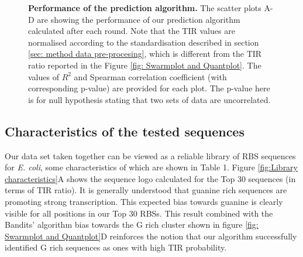 \documentclass{article}
\begin{document}
\begin{figure}[!ht]
\begin{subfigure}[b]{0.49\textwidth}
    \end{subfigure}
    \caption{\textbf{Performance of the prediction algorithm.} The scatter plots A-D are showing the performance of our prediction algorithm calculated after each round.
    Note that the TIR values are normalised according to the standardisation described in section \ref{sec: method data pre-procesing}, which is different from the TIR ratio reported in the Figure \ref{fig: Swarmplot and Quantplot}.
    The values of $R^2$ and Spearman correlation coefficient (with corresponding p-value) are provided for each plot.
    The p-value here is for null hypothesis stating that two sets of data are uncorrelated.
    }
    \label{fig: Scatterplot}
\end{figure}

\subsection{Characteristics of the tested sequences}

Our data set taken together can be viewed as a reliable library of RBS sequences for \emph{E. coli}, some characteristics of which are shown in Table 1.
Figure \ref{fig:Library characteristics}A shows the sequence logo calculated for the Top 30 sequences (in terms of TIR ratio).
It is generally understood that guanine rich sequences are promoting strong transcription.
This expected bias towards guanine is clearly visible for all positions in our Top 30 RBSs.
This result combined with the Bandits' algorithm bias towards the G rich cluster shown in figure \ref{fig: Swarmplot and Quantplot}D reinforces the notion that our algorithm successfully identified G rich sequences as ones with high TIR probability.
\end{document}
